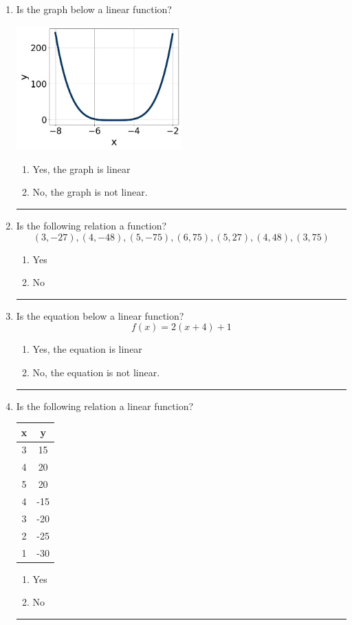 \documentclass[14pt]{extbook}
\newcommand{\litem}[1]{\item#1\hspace*{-1cm}\rule{\textwidth}{0.4pt}}
\begin{document}
\begin{enumerate}
{\begin{enumerate}[label=\Alph*.]
\end{enumerate} }
\litem{
Is the graph below a linear function?
\begin{center}
    \includegraphics[width=0.5\textwidth]{../Figures/MA_8_F_1_2_graphU.png}
\end{center}
\begin{enumerate}[label=\Alph*.]
\item Yes, the graph is linear
\item No, the graph is not linear.

\end{enumerate} }
\litem{
Is the following relation a function?\[ (3, -27), (4, -48), (5, -75), (6, 75), (5, 27), (4, 48), (3, 75) \]\begin{enumerate}[label=\Alph*.]
\item Yes
\item No

\end{enumerate} }
\litem{
Is the equation below a linear function?\[ f(x) = 2(x + 4)+1 \]\begin{enumerate}[label=\Alph*.]
\item Yes, the equation is linear
\item No, the equation is not linear.

\end{enumerate} }
\litem{
Is the following relation a linear function?

\begin{tabular}{c|c}
x &y\tabularnewline \hline
3 &15\tabularnewline \hline
4 &20\tabularnewline \hline
5 &20\tabularnewline \hline
4 &-15\tabularnewline \hline
3 &-20\tabularnewline \hline
2 &-25\tabularnewline \hline
1 &-30\end{tabular}\begin{enumerate}[label=\Alph*.]
\item Yes
\item No


\end{enumerate}}
\end{enumerate}
\end{document}

